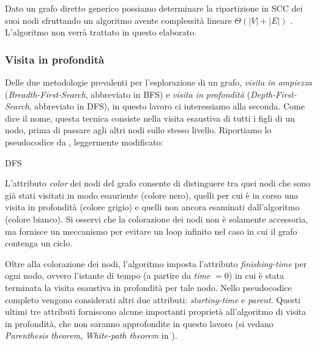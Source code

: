 Dato un grafo diretto generico possiamo determinare la ripartizione in SCC dei suoi nodi sfruttando un algoritmo avente complessità lineare $\Theta(|V| + |E|)$ \cite{tarjan}. L'algoritmo non verrà trattato in questo elaborato.\\

\subsubsection{Visita in profondità}
Delle due metodologie prevalenti per l'esplorazione di un grafo, \emph{visita in ampiezza} (\emph{Breadth-First-Search}, abbreviato in BFS) e \emph{visita in profondità} (\emph{Depth-First-Search}, abbreviato in DFS), in questo lavoro ci interessiamo alla seconda. Come dice il nome, questa tecnica consiste nella visita esaustiva di tutti i figli di un nodo, prima di passare agli altri nodi sullo stesso livello. Riportiamo lo pseudocodice da \cite{clrs}, leggermente modificato:\\
\begin{algorithm}[H]
    \label{alg:dfs}
    \caption{DFS}
    \SetAlgoLined
\end{algorithm}
L'attributo \emph{color} dei nodi del grafo consente di distinguere tra quei nodi che sono già stati visitati in modo esauriente (colore nero), quelli per cui è in corso una visita in profondità (colore grigio) e quelli non ancora esaminati dall'algoritmo (colore bianco). Si osservi che la colorazione dei nodi non è solamente accessoria, ma fornisce un meccanismo per evitare un loop infinito nel caso in cui il grafo contenga un ciclo.

Oltre alla colorazione dei nodi, l'algoritmo imposta l'attributo \emph{finishing-time} per ogni nodo, ovvero l'istante di tempo (a partire da \emph{time} $= 0$) in cui è stata terminata la visita esaustiva in profondità per tale nodo. Nello pseudocodice completo vengono considerati altri due attributi: \emph{starting-time} e \emph{parent}. Questi ultimi tre attributi forniscono alcune importanti proprietà all'algoritmo di visita in profondità, che non saranno approfondite in questo lavoro (si vedano \emph{Parenthesis theorem}, \emph{White-path theorem} in \cite{clrs}).

